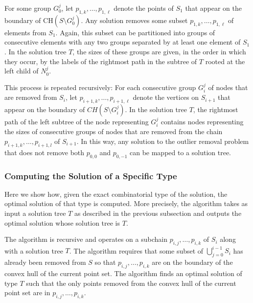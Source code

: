 \documentclass[lotsofwhite]{patmorin}
\newcommand{\ch}{\mathrm{CH}}
\begin{document}
For some group $G_0^j$, let $p_{1,k}, \ldots, p_{1,\ell}$ denote the
points of $S_1$ that appear on the boundary of $\ch(S\setminus
G_0^j)$.  Any solution removes some subset $p_{1,k},\ldots,
p_{1,\ell}$ of elements from $S_1$.  Again, this subset can be
partitioned into groups of consecutive elements with any two groups
separated by at least one element of $S_1$.  In the solution tree $T$,
the sizes of these groups are given, in the order in which they occur,
by the labels of the rightmost path in the subtree of $T$ rooted at
the left child of $N_0^j$.

This process is repeated recursively: For each consecutive group
$G_i^j$ of nodes that are removed from $S_i$, let $p_{i+1,k}, \ldots,
p_{i+1,\ell}$ denote the vertices on $S_{i+1}$ that appear on the
boundary of $CH(S \setminus G_i^j)$. In the solution tree $T$, the
rightmost path of the left subtree of the node representing $G_i^j$
contains nodes representing the sizes of consecutive groups of nodes
that are removed from the chain $p_{i+1,k}, \ldots, p_{i+1,l}$ of
$S_{i+1}$.
In this way, any solution to the outlier removal problem that does not
remove both $p_{0,0}$ and $p_{0,-1}$ can be mapped to a solution tree.



\subsubsection{Computing the Solution of a Specific Type}

Here we show how, given the exact combinatorial type of the solution,
the optimal solution of that type is computed. More precisely, the
algorithm takes as input a solution tree $T$ as described in the
previous subsection and outputs the optimal solution whose solution
tree is $T$.

The algorithm is recursive and operates on a subchain
$p_{i,j},\ldots,p_{i,k}$ of $S_i$ along with a solution tree $T$.  The
algorithm requires that some subset of $\bigcup_{j=0}^{i-1}S_i$ has
already been removed from $S$ so that $p_{i,j},\ldots,p_{i,k}$ are on
the boundary of the convex hull of the current point set.  The
algorithm finds an optimal solution of type $T$ such that the only
points removed from the convex hull of the current point set are in
$p_{i,j},\ldots,p_{i,k}$.
\end{document}

